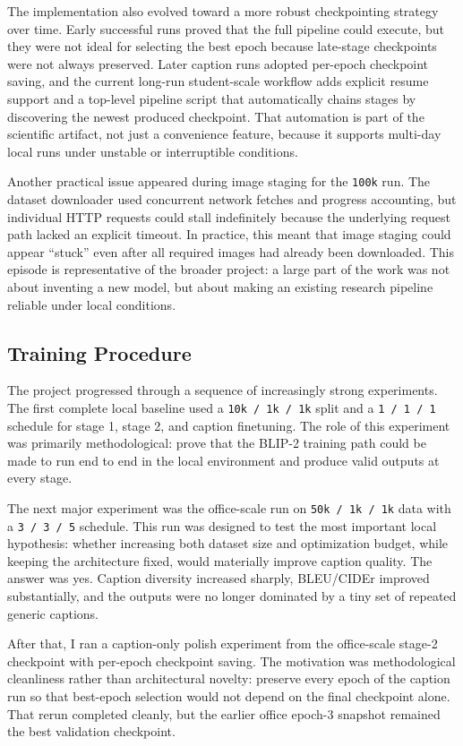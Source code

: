 \documentclass[11pt]{article}
\begin{document}
The implementation also evolved toward a more robust checkpointing strategy over time. Early successful runs proved that the full pipeline could execute, but they were not ideal for selecting the best epoch because late-stage checkpoints were not always preserved. Later caption runs adopted per-epoch checkpoint saving, and the current long-run student-scale workflow adds explicit resume support and a top-level pipeline script that automatically chains stages by discovering the newest produced checkpoint. That automation is part of the scientific artifact, not just a convenience feature, because it supports multi-day local runs under unstable or interruptible conditions.

Another practical issue appeared during image staging for the \texttt{100k} run. The dataset downloader used concurrent network fetches and progress accounting, but individual HTTP requests could stall indefinitely because the underlying request path lacked an explicit timeout. In practice, this meant that image staging could appear ``stuck'' even after all required images had already been downloaded. This episode is representative of the broader project: a large part of the work was not about inventing a new model, but about making an existing research pipeline reliable under local conditions.

\subsection{Training Procedure}
The project progressed through a sequence of increasingly strong experiments. The first complete local baseline used a \texttt{10k / 1k / 1k} split and a \texttt{1 / 1 / 1} schedule for stage 1, stage 2, and caption finetuning. The role of this experiment was primarily methodological: prove that the BLIP-2 training path could be made to run end to end in the local environment and produce valid outputs at every stage.

The next major experiment was the office-scale run on \texttt{50k / 1k / 1k} data with a \texttt{3 / 3 / 5} schedule. This run was designed to test the most important local hypothesis: whether increasing both dataset size and optimization budget, while keeping the architecture fixed, would materially improve caption quality. The answer was yes. Caption diversity increased sharply, BLEU/CIDEr improved substantially, and the outputs were no longer dominated by a tiny set of repeated generic captions.

After that, I ran a caption-only polish experiment from the office-scale stage-2 checkpoint with per-epoch checkpoint saving. The motivation was methodological cleanliness rather than architectural novelty: preserve every epoch of the caption run so that best-epoch selection would not depend on the final checkpoint alone. That rerun completed cleanly, but the earlier office epoch-3 snapshot remained the best validation checkpoint.
\end{document}
